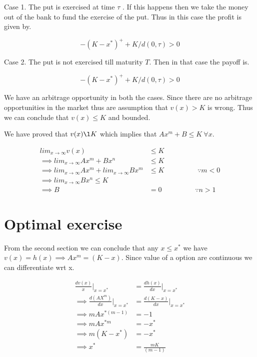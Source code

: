\documentclass[12pt]{report}
\begin{document}
Case 1. The put is exercised at time $\tau$ . If this happens then we take the money out of the bank to fund the exercise of the put. Thus in this case the profit is given by.

\begin{equation*}
	-(K-x^*)^+  + K/d(0,\tau) > 0
\end{equation*}


Case 2. The put is not exercised till maturity $T$. Then in that case the payoff is.

\begin{equation*}
	-(K-x^*)^+  + K/d(0,\tau) > 0
\end{equation*}

We have an arbitrage opportunity in both the cases. Since there are no arbitrage opportunities in the market thus are assumption that  $v(x) > K$ is wrong. Thus we can conclude that $v(x) \leq K$ and bounded.

We have proved that $v(x) \l K$ which implies that $Ax^m + B \leq K \ \forall x$. 

\begin{equation*}
	\begin{aligned}
		lim_{x\rightarrow \infty} v(x) & \leq K\\
		\implies lim_{x\rightarrow \infty} Ax^m + Bx^n & \leq K\\ 
		\implies lim_{x\rightarrow \infty} Ax^ m + lim_{x\rightarrow \infty} Bx^m & \leq K \hspace{2cm} \text{$\because m < 0$} \\
		\implies lim_{x\rightarrow \infty} Bx^n \leq K \\
		\implies B &= 0 \hspace{2cm} \text{$\because n >1$}
	\end{aligned}
\end{equation*}

\section*{Optimal exercise}
From the second section we can conclude that any $x \leq x^*$  we have $v(x) = h(x) \implies  Ax^m = (K-x)$. Since value of a option are continuous we can differentiate wrt x. 

\begin{equation*}
	\begin{aligned}
		\frac{dv(x)}{x}|_{x=x^*} &=  \frac{dh(x)}{dx}|_{x=x^*} \\
		\implies \frac{d(AX^m)}{dx}|_{x=x^*} &= \frac{d(K-x)}{dx}|_{x=x^*} \\
		\implies mAx^{*(m-1)} &= -1 \\
		\implies mAx^{*m} &= -x^* \\
		\implies m (K-x^*) &= -x^* \\
		\implies x^* &= \frac{mK}{(m-1)}
	\end{aligned}	
\end{equation*}
\end{document}

